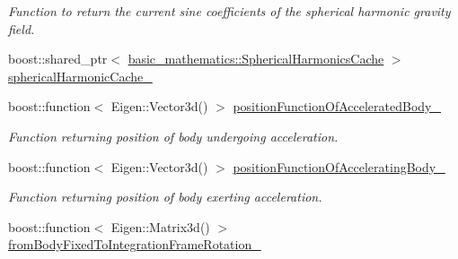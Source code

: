 \begin{DoxyCompactItemize}
\begin{DoxyCompactList}\small\item\em Function to return the current sine coefficients of the spherical harmonic gravity field. \end{DoxyCompactList}\item 
boost\+::shared\+\_\+ptr$<$ \hyperlink{classtudat_1_1basic__mathematics_1_1SphericalHarmonicsCache}{basic\+\_\+mathematics\+::\+Spherical\+Harmonics\+Cache} $>$ \hyperlink{classtudat_1_1acceleration__partials_1_1SphericalHarmonicsGravityPartial_a0ec88f0ff9a7ae8115160915ce2f5598}{spherical\+Harmonic\+Cache\+\_\+}
\item 
boost\+::function$<$ Eigen\+::\+Vector3d() $>$ \hyperlink{classtudat_1_1acceleration__partials_1_1SphericalHarmonicsGravityPartial_a2c3fce4210bcd50d4e8fddcb9123581d}{position\+Function\+Of\+Accelerated\+Body\+\_\+}\hypertarget{classtudat_1_1acceleration__partials_1_1SphericalHarmonicsGravityPartial_a2c3fce4210bcd50d4e8fddcb9123581d}{}\label{classtudat_1_1acceleration__partials_1_1SphericalHarmonicsGravityPartial_a2c3fce4210bcd50d4e8fddcb9123581d}

\begin{DoxyCompactList}\small\item\em Function returning position of body undergoing acceleration. \end{DoxyCompactList}\item 
boost\+::function$<$ Eigen\+::\+Vector3d() $>$ \hyperlink{classtudat_1_1acceleration__partials_1_1SphericalHarmonicsGravityPartial_ae812c437f2c87d571e42d86fbb96e6df}{position\+Function\+Of\+Accelerating\+Body\+\_\+}\hypertarget{classtudat_1_1acceleration__partials_1_1SphericalHarmonicsGravityPartial_ae812c437f2c87d571e42d86fbb96e6df}{}\label{classtudat_1_1acceleration__partials_1_1SphericalHarmonicsGravityPartial_ae812c437f2c87d571e42d86fbb96e6df}

\begin{DoxyCompactList}\small\item\em Function returning position of body exerting acceleration. \end{DoxyCompactList}\item 
boost\+::function$<$ Eigen\+::\+Matrix3d() $>$ \hyperlink{classtudat_1_1acceleration__partials_1_1SphericalHarmonicsGravityPartial_ae8ea87254f8c20a7343626c05a6823bf}{from\+Body\+Fixed\+To\+Integration\+Frame\+Rotation\+\_\+}\hypertarget{classtudat_1_1acceleration__partials_1_1SphericalHarmonicsGravityPartial_ae8ea87254f8c20a7343626c05a6823bf}{}\label{classtudat_1_1acceleration__partials_1_1SphericalHarmonicsGravityPartial_ae8ea87254f8c20a7343626c05a6823bf}


\end{DoxyCompactItemize}
